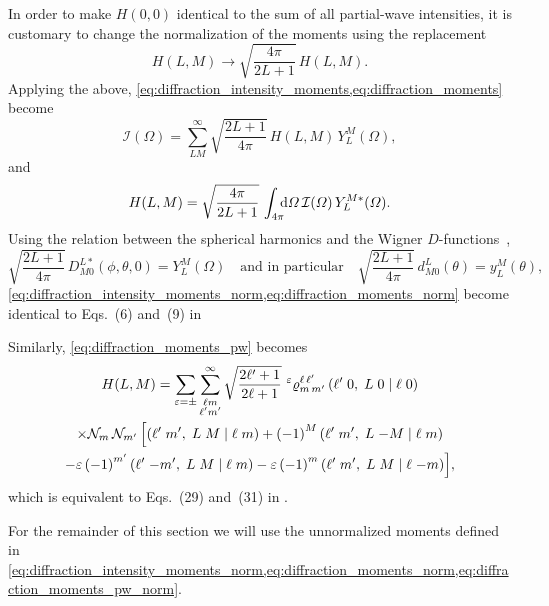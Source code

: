 In order to make $H(0, 0)$ identical to the sum of all partial-wave
intensities, it is customary to change the normalization of the
moments using the replacement
\begin{equation}
  H(L, M)
  \to \sqrt{\frac{4 \pi}{2 L + 1}}\, H(L, M).
\end{equation}
Applying the above,
\cref{eq:diffraction_intensity_moments,eq:diffraction_moments} become
\begin{equation}
  \label{eq:diffraction_intensity_moments_norm}
  \mathcal{I}(\Omega)
  = \sum_{L M}^\infty \sqrt{\frac{2 L + 1}{4 \pi}}\, H(L, M)\, Y_L^M(\Omega),
\end{equation}
and
\begin{equation}
  \label{eq:diffraction_moments_norm}
  H(L, M)
  = \sqrt{\frac{4 \pi}{2 L + 1}}\, \int_{4 \pi}\!\!\! \dif{\Omega}\, \mathcal{I}(\Omega)\, Y_L^{M *}(\Omega).
\end{equation}
Using the relation between the spherical harmonics and the Wigner
$D$-functions~\cite{wikipedia:wignerD}, \ie
\begin{equation}
  \sqrt{\frac{2 L + 1}{4 \pi}}\, D^{L *}_{M 0}(\phi, \theta, 0)
  = Y_L^M(\Omega)
  \quad\text{and in particular}\quad
  \sqrt{\frac{2 L + 1}{4 \pi}}\, d^L_{M 0}(\theta)
  = y_L^M(\theta),
\end{equation}
\cref{eq:diffraction_intensity_moments_norm,eq:diffraction_moments_norm}
become identical to Eqs.~(6) and~(9) in 

Similarly, \cref{eq:diffraction_moments_pw} becomes
\begin{multline}
  \label{eq:diffraction_moments_pw_norm}
  H(L, M)
  = \sum_{\varepsilon = \pm} \sum_{\substack{\ell m \\ \ell' m'}}^\infty
    \sqrt{\frac{2 \ell' + 1}{2 \ell + 1}}\,
    \prescript{\ensuremath{\varepsilon}}{}{\varrho}^{\ell\, \ell'}_{m\, m'}\, ({\ell'}\;{0},\;{L}\;{0}\; |\; {\ell}\;{0}) \\
    \times \mathcal{N}_m\, \mathcal{N}_{m'}\, \Big[
      ({\ell'}\;{m'},\;{L}\;{M}\; |\; {\ell}\;{m})
      + {(-1)}^M\, ({\ell'}\;{m'},\;{L}\;{-M}\; |\; {\ell}\;{m}) \\
      - \varepsilon\, {(-1)}^{m'}\, ({\ell'}\;{-m'},\;{L}\;{M}\; |\; {\ell}\;{m})
      - \varepsilon\, {(-1)}^m\, ({\ell'}\;{m'},\;{L}\;{M}\; |\; {\ell}\;{-m}) \Big],
\end{multline}
which is equivalent to Eqs.~(29) and~(31) in .

For the remainder of this section we will use the unnormalized moments
defined in
\cref{eq:diffraction_intensity_moments_norm,eq:diffraction_moments_norm,eq:diffraction_moments_pw_norm}.


